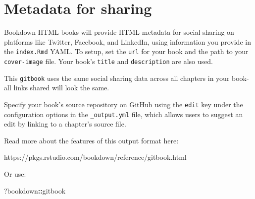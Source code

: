 \documentclass[
  french,
]{book}
\newenvironment{Shaded}{\begin{snugshade}}{\end{snugshade}}
\newcommand{\NormalTok}[1]{#1}
\newcommand{\SpecialCharTok}[1]{\textcolor[rgb]{0.81,0.36,0.00}{\textbf{#1}}}
\theoremstyle{definition}
\theoremstyle{definition}
\theoremstyle{definition}
\theoremstyle{definition}
\theoremstyle{remark}
\begin{document}
\section{Metadata for sharing}

Bookdown HTML books will provide HTML metadata for social sharing on platforms like Twitter, Facebook, and LinkedIn, using information you provide in the \texttt{index.Rmd} YAML. To setup, set the \texttt{url} for your book and the path to your \texttt{cover-image} file. Your book's \texttt{title} and \texttt{description} are also used.

This \texttt{gitbook} uses the same social sharing data across all chapters in your book- all links shared will look the same.

Specify your book's source repository on GitHub using the \texttt{edit} key under the configuration options in the \texttt{\_output.yml} file, which allows users to suggest an edit by linking to a chapter's source file.

Read more about the features of this output format here:

https://pkgs.rstudio.com/bookdown/reference/gitbook.html

Or use:

\begin{Shaded}
\begin{Highlighting}[]
\NormalTok{?bookdown}\SpecialCharTok{::}\NormalTok{gitbook}
\end{Highlighting}
\end{Shaded}



\end{document}

